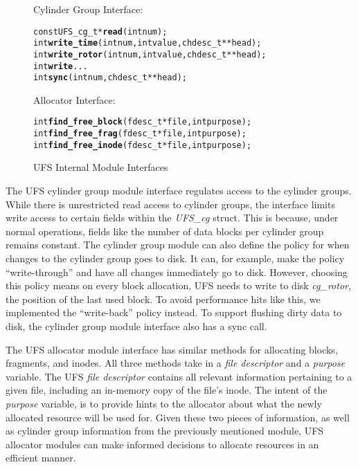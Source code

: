 \begin{figure}[htb]
Cylinder Group Interface:
\vspace{-0.5\baselineskip}
\begin{scriptsize}
\begin{alltt}
const UFS_cg_t * \textbf{read}(int num);
int \textbf{write_time}(int num, int value, chdesc_t ** head);
int \textbf{write_rotor}(int num, int value, chdesc_t ** head);
int \textbf{write}...
int \textbf{sync}(int num, chdesc_t ** head);
\end{alltt}
\end{scriptsize}

Allocator Interface:
\vspace{-0.5\baselineskip}
\begin{scriptsize}
\begin{alltt}
int \textbf{find_free_block}(fdesc_t * file, int purpose);
int \textbf{find_free_frag}(fdesc_t * file, int purpose);
int \textbf{find_free_inode}(fdesc_t * file, int purpose);
\end{alltt}
\end{scriptsize}
\vspace{-0.5\baselineskip}
\caption{\label{fig:moduleinterface} UFS Internal Module Interfaces}
\end{figure}

The UFS cylinder group module interface regulates access to the cylinder
groups. While there is unrestricted read access to cylinder groups, the
interface limits write access to certain fields within the \emph{UFS\_cg}
struct. This is because, under normal operations, fields like the number of
data blocks per cylinder group remains constant. The cylinder group module can
also define the policy for when changes to the cylinder group goes to disk.
It can, for example, make the policy ``write-through'' and have all changes
immediately go to disk. However, choosing this policy means on every block
allocation, UFS needs to write to disk \emph{cg\_rotor}, the position of the
last used block. To avoid performance hits like this, we implemented the
``write-back'' policy instead. To support flushing dirty data to disk, the
cylinder group module interface also has a sync call.

The UFS allocator module interface has similar methods for allocating blocks,
fragments, and inodes. All three methods take in a \emph{file descriptor} and
a \emph{purpose} variable. The UFS \emph{file descriptor} contains all relevant
information pertaining to a given file, including an in-memory copy of the
file's inode. The intent of the \emph{purpose} variable, is to provide hints to
the allocator about what the newly allocated resource will be used for. Given
these two pieces of information, as well as cylinder group information from the
previously mentioned module, UFS allocator modules can make informed decisions
to allocate resources in an efficient manner.

